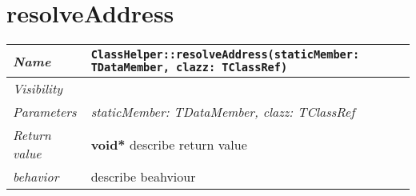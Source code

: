 \section{resolveAddress}
\begin{longtable}{p{3cm} @{\hskip 1cm} p{12cm}}
\hline
\textit{Name} & \texttt{ClassHelper::resolveAddress(staticMember: TDataMember, clazz: TClassRef)}\\
\hline
\textit{Visibility} & \\
\hline
\textit{Parameters} & \textit{staticMember: TDataMember, clazz: TClassRef}\\
\hline
\textit{Return value} & \textbf{ void*} describe return value\\
 \hline
\textit{behavior} & describe beahviour \\
\hline
\end{longtable} \pagebreak
